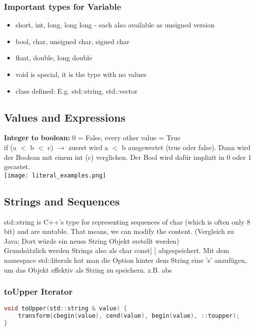 \subsubsection{Important types for Variable}
\begin{itemize}
    \item short, int, long, long long - each also available as unsigned version
    \item bool, char, unsigned char, signed char
    \item float, double, long double
    \item void is special, it is the type with no values
    \item class defined: E.g. std::string, std::vector
\end{itemize}

\subsection{Values and Expressions}
\textbf{Integer to boolean:} 0 = False, every other value = True\\
if (a $<$ b $<$ c) $\rightarrow$ zuerst wird a $<$ b ausgewertet (true oder false). Dann wird der Boolean mit einem int (c) verglichen. Der Bool wird dafür implizit in 0 oder 1 gecastet.\\
\texttt{[image: literal\_examples.png]}

\subsection{Strings and Sequences}
std::string is C++'s type for representing sequences of char (which is often only 8 bit) and are mutable. That means, we can modify the content. (Vergleich zu Java: Dort würde ein neues String Objekt erstellt werden)\\
Grundsätzlich werden Strings also als char const[ ] abgespeichert. Mit dem namespace std::literals hat man die Option hinter dem String eine 's' anzufügen, um das Objekt effektiv als String zu speichern. z.B. \dq ab\dq s
\subsubsection{toUpper Iterator}
\begin{lstlisting}[style=frame, style= linenumbers, language=C]
void toUpper(std::string & value) {
    transform(cbegin(value), cend(value), begin(value), ::toupper);
}
\end{lstlisting}

